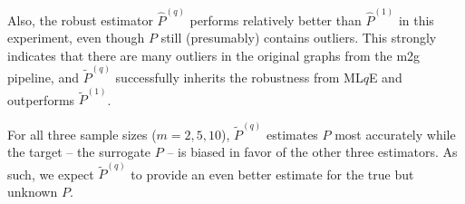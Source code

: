 \documentclass[a4paper]{article}
\renewcommand{\hat}{\widehat}
\begin{document}
Also, the robust estimator $\hat{P}^{(q)}$ performs relatively better than $\hat{P}^{(1)}$ in this experiment, even though $P$ still (presumably) contains outliers. This strongly indicates that there are many outliers in the original graphs from the m2g pipeline, and $\widetilde{P}^{(q)}$ successfully inherits the robustness from ML$q$E and outperforms $\widetilde{P}^{(1)}$.

For all three sample sizes ($m = 2, 5, 10$), $\widetilde{P}^{(q)}$ estimates $P$ most accurately while the target -- the surrogate $P$ -- is biased in favor of the other three estimators. As such, we expect $\widetilde{P}^{(q)}$ to provide an even better estimate for the true but unknown $P$.




%
%
%
\end{document}
